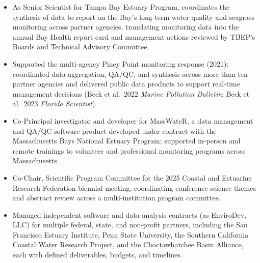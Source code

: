 \documentclass[letterpaper,12pt]{article}
\begin{document}
\vspace{4pt}
\begin{itemize}
\item As Senior Scientist for Tampa Bay Estuary Program, coordinates the synthesis of data to report on the Bay's long-term water quality and seagrass monitoring across partner agencies, translating monitoring data into the annual Bay Health report card and management actions reviewed by TBEP's Boards and Technical Advisory Committee.
\item Supported the multi-agency Piney Point monitoring response (2021): coordinated data aggregation, QA/QC, and synthesis across more than ten partner agencies and delivered public data products to support real-time management decisions (Beck et al.\ 2022 \textit{Marine Pollution Bulletin}; Beck et al.\ 2023 \textit{Florida Scientist}).
\item Co-Principal investigator and developer for MassWateR, a data management and QA/QC software product developed under contract with the Massachusetts Bays National Estuary Program; supported in-person and remote trainings to volunteer and professional monitoring programs across Massachusetts.
\item Co-Chair, Scientific Program Committee for the 2025 Coastal and Estuarine Research Federation biennial meeting, coordinating conference science themes and abstract review across a multi-institution program committee.
\item Managed independent software and data-analysis contracts (as EnviroDev, LLC) for multiple federal, state, and non-profit partners, including the San Francisco Estuary Institute, Penn State University, the Southern California Coastal Water Research Project, and the Choctawhatchee Basin Alliance, each with defined deliverables, budgets, and timelines.
\end{itemize}
\end{document}

